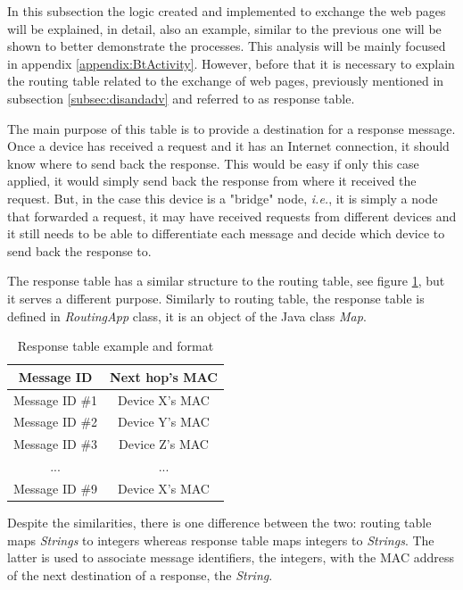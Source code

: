 In this subsection the logic created and implemented to exchange the web pages will be explained, in detail, also an example, similar to the previous one will be shown to better demonstrate the processes. This analysis will be mainly focused in appendix \ref{appendix:BtActivity}. However, before that it is necessary to explain the routing table related to the exchange of web pages, previously mentioned in subsection \ref{subsec:disandadv} and referred to as response table.

The main purpose of this table is to provide a destination for a response message. Once a device has received a request and it has an Internet connection, it should know where to send back the response. This would be easy if only this case applied, it would simply send back the response from where it received the request. But, in the case this device is a "bridge" node, \textit{i.e.}, it is simply a node that forwarded a request, it may have received requests from different devices and it still needs to be able to differentiate each message and decide which device to send back the response to.

The response table has a similar structure to the routing table, see figure \ref{tab:rspTables}, but it serves a different purpose. Similarly to routing table, the response table is defined in \textit{RoutingApp} class, it is an object of the Java class \textit{Map}.

\begin{table}[ht]
\centering
\bgroup
\def\arraystretch{2.5}
\begin{tabular}{|c|c|}
\hline
\textbf{Message ID} & \textbf{Next hop's MAC} \\ \hline
Message ID \#1 & Device X's MAC \\ \hline
Message ID \#2 & Device Y's MAC \\ \hline
Message ID \#3 & Device Z's MAC \\ \hline
... & ... \\ \hline
Message ID \#9 & Device X's MAC \\ \hline
\end{tabular}
\egroup
\caption{Response table example and format}
\label{tab:rspTables}
\end{table}

Despite the similarities, there is one difference between the two: routing table maps \textit{Strings} to integers whereas response table maps integers to \textit{Strings}. The latter is used to associate message identifiers, the integers, with the \gls{MAC} address of the next destination of a response, the \textit{String}.

